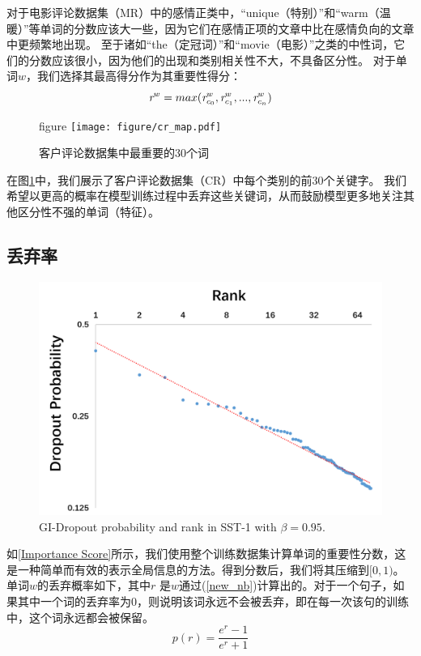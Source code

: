 对于电影评论数据集（MR）中的感情正类中，``unique（特别）''和``warm（温暖）''等单词的分数应该大一些，因为它们在感情正项的文章中比在感情负向的文章中更频繁地出现。
至于诸如``the（定冠词）''和``movie（电影）''之类的中性词，它们的分数应该很小，因为他们的出现和类别相关性不大，不具备区分性。
对于单词$w$，我们选择其最高得分作为其重要性得分：
\begin{equation}\label{final_score}
  \emph{r}^{w} = max(\emph{r}_{c_{0}}^{w}, \emph{r}_{c_{1}}^{w}, ..., \emph{r}_{c_{n}}^{w})
\end{equation}

\begin{figure}[!t]figure
\centering
\texttt{[image: figure/cr\_map.pdf]}
\caption{客户评论数据集中最重要的30个词}
\label{fig: keyword}
\end{figure}
在图\ref{fig: keyword}中，我们展示了客户评论数据集（CR）中每个类别的前30个关键字。
我们希望以更高的概率在模型训练过程中丢弃这些关键词，从而鼓励模型更多地关注其他区分性不强的单词（特征）。

\subsection{丢弃率}
\label{dropout rate}
\begin{figure}[!t]
\centering
  \includegraphics[width=\linewidth]{figure/zipf.png}
  \caption{GI-Dropout probability and rank in SST-1 with $\beta = 0.95$.}
  \label{fig:zipf}
\end{figure}

如\ref{Importance Score}所示，我们使用整个训练数据集计算单词的重要性分数，这是一种简单而有效的表示全局信息的方法。得到分数后，我们将其压缩到$[0, 1)$。单词$w$的丢弃概率如下，其中$r$ 是$w$通过(\ref{new_nb})计算出的。对于一个句子，如果其中一个词的丢弃率为0，则说明该词永远不会被丢弃，即在每一次该句的训练中，这个词永远都会被保留。
\begin{equation}
\label{equation:our fuction}
p(r) = \frac{e^{r} - 1}{e^{r} + 1}
\end{equation}

